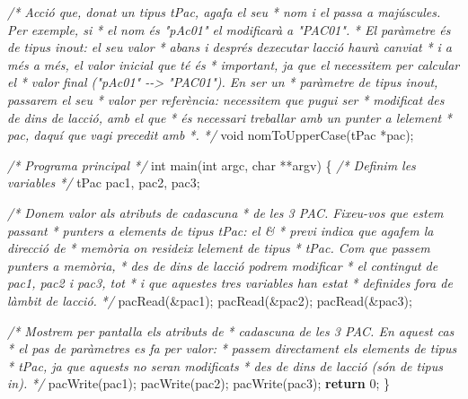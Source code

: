 \documentclass[
]{book}
\newenvironment{Shaded}{\begin{snugshade}}{\end{snugshade}}
\newcommand{\CommentTok}[1]{\textcolor[rgb]{0.56,0.35,0.01}{\textit{#1}}}
\newcommand{\ControlFlowTok}[1]{\textcolor[rgb]{0.13,0.29,0.53}{\textbf{#1}}}
\newcommand{\DataTypeTok}[1]{\textcolor[rgb]{0.13,0.29,0.53}{#1}}
\newcommand{\DecValTok}[1]{\textcolor[rgb]{0.00,0.00,0.81}{#1}}
\newcommand{\NormalTok}[1]{#1}
\begin{document}
\begin{Shaded}
\begin{Highlighting}[]
\CommentTok{/* Acció que, donat un tipus tPac, agafa el seu}
\CommentTok{ * nom i el passa a majúscules. Per exemple, si}
\CommentTok{ * el nom és "pAc01" el modificarà a "PAC01".}
\CommentTok{ * El paràmetre és de tipus \textquotesingle{}inout\textquotesingle{}: el seu valor}
\CommentTok{ * abans i després d\textquotesingle{}executar l\textquotesingle{}acció haurà canviat}
\CommentTok{ * i a més a més, el valor inicial que té és}
\CommentTok{ * important, ja que el necessitem per calcular el}
\CommentTok{ * valor final ("pAc01" {-}{-}\textgreater{} "PAC01"). En ser un}
\CommentTok{ * paràmetre de tipus \textquotesingle{}inout\textquotesingle{}, passarem el seu}
\CommentTok{ * valor per referència: necessitem que pugui ser}
\CommentTok{ * modificat des de dins de l\textquotesingle{}acció, amb el que}
\CommentTok{ * és necessari treballar amb un punter a l\textquotesingle{}element}
\CommentTok{ * pac, d\textquotesingle{}aquí que vagi precedit amb *.}
\CommentTok{ */}
\DataTypeTok{void}\NormalTok{ nomToUpperCase(tPac *pac);}

\CommentTok{/* Programa principal */}
\DataTypeTok{int}\NormalTok{ main(}\DataTypeTok{int}\NormalTok{ argc, }\DataTypeTok{char}\NormalTok{ **argv) \{}
    \CommentTok{/* Definim les variables */}
\NormalTok{    tPac pac1, pac2, pac3;}

    \CommentTok{/* Donem valor als atributs de cadascuna}
\CommentTok{     * de les 3 PAC. Fixeu{-}vos que estem passant}
\CommentTok{     * punters a elements de tipus tPac: el \&}
\CommentTok{     * previ indica que agafem la direcció de }
\CommentTok{     * memòria on resideix l\textquotesingle{}element de tipus }
\CommentTok{     * tPac. Com que passem punters a memòria, }
\CommentTok{     * des de dins de l\textquotesingle{}acció podrem modificar}
\CommentTok{     * el contingut de pac1, pac2 i pac3, tot}
\CommentTok{     * i que aquestes tres variables han estat}
\CommentTok{     * definides fora de l\textquotesingle{}àmbit de l\textquotesingle{}acció.}
\CommentTok{     */}
\NormalTok{    pacRead(\&pac1);}
\NormalTok{    pacRead(\&pac2);}
\NormalTok{    pacRead(\&pac3);}
    
    \CommentTok{/* Mostrem per pantalla els atributs de}
\CommentTok{     * cadascuna de les 3 PAC. En aquest cas}
\CommentTok{     * el pas de paràmetres es fa per valor:}
\CommentTok{     * passem directament els elements de tipus}
\CommentTok{     * tPac, ja que aquests no seran modificats}
\CommentTok{     * des de dins de l\textquotesingle{}acció (són de tipus \textquotesingle{}in\textquotesingle{}).}
\CommentTok{     */}
\NormalTok{    pacWrite(pac1);}
\NormalTok{    pacWrite(pac2);}
\NormalTok{    pacWrite(pac3);}
    \ControlFlowTok{return} \DecValTok{0}\NormalTok{;}
\NormalTok{\}}


\end{Highlighting}
\end{Shaded}
\end{document}

